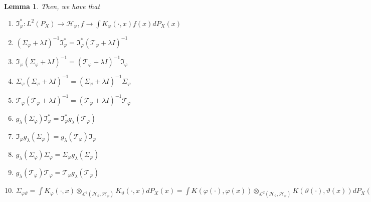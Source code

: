 \documentclass{article} %
\newcommand{\I}{\mathfrak{I}}
\newcommand{\HS}{\mathcal{L}^{2}}
\newcommand{\rep}{\varphi}
\newcommand{\Hrep}{\mathcal{H}_{\varphi}}
\newcommand{\Srep}{\Sigma_{\rep}}
\newcommand{\Sreplambdainv}{(\Srep+\lambda I)^{-1}}
\newcommand{\Trep}{\mathcal{T}_{\rep}}
\newcommand{\Treplambdainv}{(\Trep+\lambda I)^{-1}}
\newcommand{\Irep}{\I_{\rep}}
\newcommand{\Irepad}{\Irep^{*}}
\newcommand{\gl}{g_{\lambda}}
\newcommand{\LPtwo}{L^{2}(P_{X})}
\theoremstyle{plain}
\newcounter{lemmano}
\newtheorem{lemma}[lemmano]{Lemma}
\begin{document}
\begin{lemma}
    Then, we have that
    \begin{enumerate}[label=(\roman*)] 
        \item \label{Elementary prop 1}
        $\Irepad:\LPtwo \to \Hrep, f \to \int K_{\rep}(\cdot,x)f(x)dP_{X}(x)$
        \item \label{Elementary prop 2} $\Sreplambdainv \Irepad = \Irepad \Treplambdainv$
        \item \label{Elementary prop 3} $\Irep \Sreplambdainv = \Treplambdainv \Irep$
        \item \label{Elementary prop 4} $\Srep \Sreplambdainv = \Sreplambdainv \Srep$
        \item \label{Elementary prop 5} $\Trep \Treplambdainv = \Treplambdainv \Trep$
        \item \label{Elementary prop 6} $\gl(\Srep) \Irepad = \Irepad \gl(\Trep)$
        \item \label{Elementary prop 7} $\Irep \gl(\Srep) = \gl(\Trep) \Irep$
        \item \label{Elementary prop 8} $\gl(\Srep) \Srep = \Srep \gl(\Srep)$
        \item \label{Elementary prop 9} $\gl(\Trep) \Trep = \Trep \gl(\Trep)$
        \item \label{Elementary prop 10} $\Sigma_{\rep\vartheta} = \int K_{\rep}(\cdot,x) \otimes_{\HS(\mathcal{H}_{\vartheta},\Hrep)}  K_{\vartheta}(\cdot,x) dP_{X}(x) = \int K(\rep(\cdot),\rep(x)) \otimes_{\HS(\mathcal{H}_{\vartheta},\Hrep)}  K(\vartheta(\cdot),\vartheta(x)) dP_{X}(x)$
    \end{enumerate}
\end{lemma}
\end{document}
